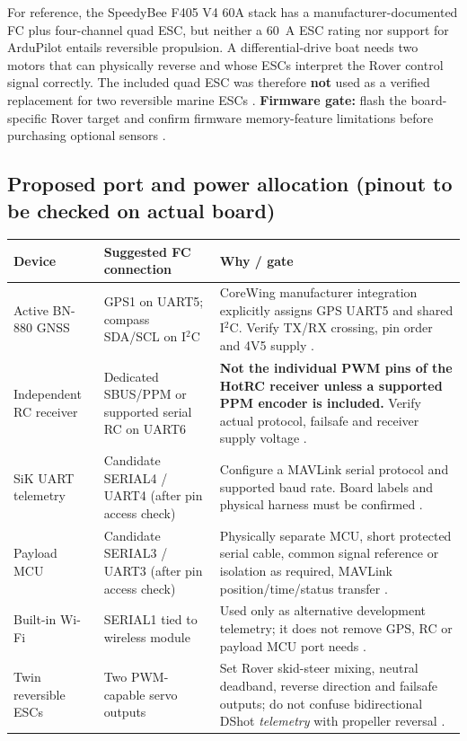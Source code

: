 For reference, the SpeedyBee F405 V4 60A stack has a manufacturer-documented FC plus four-channel quad ESC, but neither a 60~A ESC rating nor support for ArduPilot entails reversible propulsion. A differential-drive boat needs two motors that can physically reverse and whose ESCs interpret the Rover control signal correctly. The included quad ESC was therefore \textbf{not} used as a verified replacement for two reversible marine ESCs \cite{speedDoc,speedAP,motor}. \textbf{Firmware gate:} flash the board-specific Rover target and confirm firmware memory-feature limitations before purchasing optional sensors \cite{coreDoc}.

\subsection{Proposed port and power allocation (pinout to be checked on actual board)}
\begin{tabularx}{\linewidth}{L{34mm}L{45mm}Y}
\toprule Device & Suggested FC connection & Why / gate \\\midrule
Active BN-880 GNSS & GPS1 on UART5; compass SDA/SCL on I$^2$C & CoreWing manufacturer integration explicitly assigns GPS UART5 and shared I$^2$C. Verify TX/RX crossing, pin order and 4V5 supply \cite{coreDoc,bn880Series}.\\
Independent RC receiver & Dedicated SBUS/PPM or supported serial RC on UART6 & \textbf{Not the individual PWM pins of the HotRC receiver unless a supported PPM encoder is included.} Verify actual protocol, failsafe and receiver supply voltage \cite{coreDoc,hotrcCurrent,rcPWMEncoder}.\\
SiK UART telemetry & Candidate SERIAL4 / UART4 (after pin access check) & Configure a MAVLink serial protocol and supported baud rate. Board labels and physical harness must be confirmed \cite{coreDoc,radioConfig}.\\
Payload MCU & Candidate SERIAL3 / UART3 (after pin access check) & Physically separate MCU, short protected serial cable, common signal reference or isolation as required, MAVLink position/time/status transfer \cite{coreDoc,mav}.\\
Built-in Wi-Fi & SERIAL1 tied to wireless module & Used only as alternative development telemetry; it does not remove GPS, RC or payload MCU port needs \cite{coreDoc}.\\
Twin reversible ESCs & Two PWM-capable servo outputs & Set Rover skid-steer mixing, neutral deadband, reverse direction and failsafe outputs; do not confuse bidirectional DShot \emph{telemetry} with propeller reversal \cite{coreDoc,motor,ztwDoc}.\\
\bottomrule
\end{tabularx}

